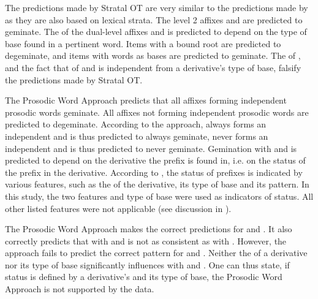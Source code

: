 The predictions made by Stratal OT are very similar to the predictions made by  as they are also based on lexical strata. 
The level 2 affixes  and  are predicted to geminate. The  of the dual-level affixes  and  is predicted to depend on the type of base found in a pertinent word. Items with a bound root are predicted to degeminate, and items with words as bases are predicted to geminate. The  of , and the fact that  of  and  is independent from a derivative's type of base, falsify the predictions made by Stratal OT.  

The Prosodic Word Approach predicts that all affixes forming independent prosodic words geminate. All affixes not forming independent prosodic words are predicted to degeminate. According to the approach,  always forms an independent  and is thus predicted to always geminate,  never forms an independent  and is thus predicted to never geminate. Gemination with  and  is predicted to depend on the derivative the prefix is found in, i.e. on the  status of the prefix in the  derivative. 
According to \cite{Raffelsiefen.1999}, the  status of prefixes is indicated by various features, such as the  of the derivative, its type of base and its  pattern. In this study, the two features  and type of base were used as indicators of  status. All other listed features were not applicable (see discussion in ). 

The Prosodic Word Approach  makes the correct predictions for  and . It also correctly predicts that  with  and  is not as consistent as  with . However, the approach fails to predict the correct  pattern for  and . 
 Neither the  of a derivative nor its type of base significantly influences  with  and .
One can thus state, if  status is defined by a derivative's  and its type of base, the Prosodic Word Approach is not supported by the data.


